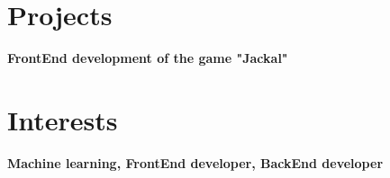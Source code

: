 \documentclass[a4paper,10pt]{article}
\newcommand{\MySkip}{
\vskip12pt
}
\begin{document}
\begin{adjustbox}{valign=t}
\begin{minipage}{0.6\textwidth}
\begin{description}
\end{description}

\section*{Projects}
\begin{description}
	\raggedright
	\item [\normalfont \textcolor{ColorOne}{2021}] \textbf{FrontEnd development of the game "Jackal"}
\end{description}

\MySkip
\section*{Interests}
\begin{description}
	\raggedright
	\item \textbf{Machine learning, FrontEnd developer, BackEnd developer}
\end{description}

\end{minipage}
\end{adjustbox}
\end{document}
